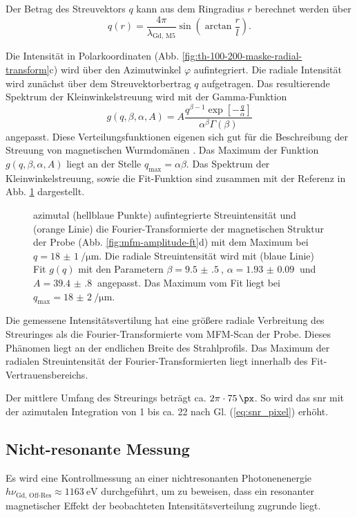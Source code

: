 \noindent
Der Betrag des Streuvektors $q$ kann aus dem Ringradius $r$ berechnet werden über
\begin{equation}
    q(r) = \frac{4\pi}{\lambda_\text{Gd, M5}}\sin\left(\arctan\frac{r}{l}\right).
    \label{eq:streuvektor_von_radius}
\end{equation}

\noindent
Die Intensität in Polarkoordinaten (Abb. \ref{fig:th-100-200-maske-radial-transform}c) wird über den Azimutwinkel $\varphi$ aufintegriert. Die radiale Intensität wird zunächst über dem Streuvektorbertrag $q$  aufgetragen. Das resultierende Spektrum der Kleinwinkelstreuung wird mit der Gamma-Funktion
\begin{equation}
    g(q, \beta, \alpha, A) = A\frac{q^{\beta-1}\exp\left[-\frac{q}{\alpha}\right]}{\alpha^\beta\Gamma(\beta)}
\end{equation}
angepasst. Diese Verteilungsfunktionen eigenen sich gut für die Beschreibung der Streuung von magnetischen Wurmdomänen \cite{bagschik_employing_2016}. Das Maximum der Funktion $g(q, \beta, \alpha, A)$ liegt an der Stelle $q_\text{max} = \alpha\beta$. Das Spektrum der Kleinwinkelstreuung, sowie die Fit-Funktion sind zusammen mit der Referenz in Abb. \ref{fig:radius_fit} dargestellt.
\begin{figure}[H]
    \centering
    
    \caption{azimutal (hellblaue Punkte) aufintegrierte Streuintensität und (orange Linie) die Fourier-Transformierte der magnetischen Struktur der Probe (Abb. \ref{fig:mfm-amplitude-ft}d) mit dem Maximum bei $q =\SI{18(1)}{\per\micro\meter}$. Die radiale Streuintensität wird mit (blaue Linie) Fit $g(q)$ mit den Parametern $\beta = \SI{9.5(5)}{}$, $\alpha = \SI{1.93(9)}{}$ und $A = \SI{39.4(8)}{}$ angepasst. Das Maximum vom Fit liegt bei $q_\text{max} = \SI{18(2)}{\per\micro\meter}$.}
    \label{fig:radius_fit}
\end{figure}
\noindent
Die gemessene Intensitätsvertilung hat eine größere radiale Verbreitung des Streuringes als die Fourier-Transformierte vom MFM-Scan der Probe. Dieses Phänomen liegt an der endlichen Breite des Strahlprofils. Das Maximum der radialen Streuintensität der Fourier-Transformierten liegt innerhalb des Fit-Vertrauensbereichs.

\noindent
Der mittlere Umfang des Streurings beträgt ca. $2\pi\cdot\SI{75}{\px}$. So wird das \gls{snr} mit der azimutalen Integration von 1 bis ca. 22 nach Gl. (\ref{eq:snr_pixel}) erhöht.

\subsection{Nicht-resonante Messung}
Es wird eine Kontrollmessung an einer nichtresonanten Photonenenergie $h\nu_{\text{Gd, Off-Res}} \approx \SI{1163}{\eV}$ durchgeführt, um zu beweisen, dass ein resonanter magnetischer Effekt der beobachteten Intensitätsverteilung zugrunde liegt.

